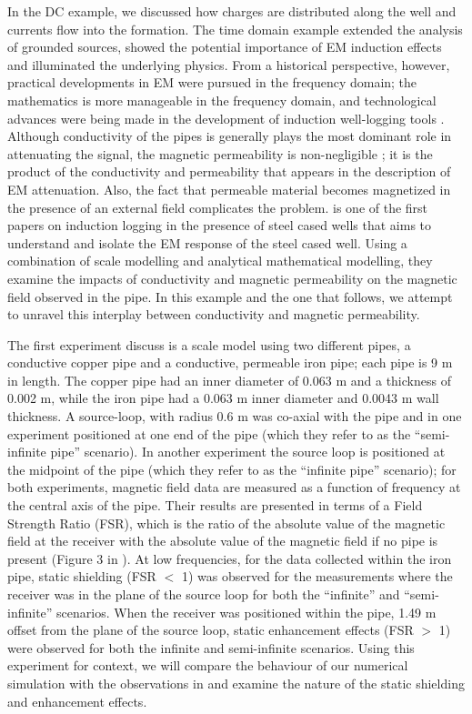 In the DC example, we discussed how charges are distributed along the well and currents flow into the formation. The time domain example extended the analysis of grounded sources, showed the potential importance of EM induction effects and illuminated the underlying physics. From a historical perspective, however, practical developments in EM were pursued in the frequency domain; the mathematics is more manageable in the frequency domain, and technological advances were being made in the development of induction well-logging tools \citep{Doll1949, Moran1962}. Although conductivity of the pipes is generally plays the most dominant role in attenuating the signal, the magnetic permeability is non-negligible \citep{Wait1977}; it is the product of the conductivity and permeability that appears in the description of EM attenuation. Also, the fact that permeable material becomes magnetized in the presence of an external field complicates the problem.
\cite{Augustin1989} is one of the first papers on induction logging in the presence of steel cased wells that aims to understand and isolate the EM response of the steel cased well. Using a combination of scale modelling and analytical mathematical modelling, they examine the impacts of conductivity and magnetic permeability on the magnetic field observed in the pipe. In this example and the one that follows, we attempt to unravel this interplay between conductivity and magnetic permeability.

The first experiment \cite{Augustin1989} discuss is a scale model using two different pipes, a conductive copper pipe and a conductive, permeable iron pipe; each pipe is 9 m in length. The copper pipe had an inner diameter of 0.063 m and a thickness of 0.002 m, while the iron pipe had a 0.063 m inner diameter and 0.0043 m wall thickness. A source-loop, with radius 0.6 m was co-axial with the pipe and in one experiment positioned at one end of the pipe (which they refer to as the ``semi-infinite pipe'' scenario). In another experiment the source loop is positioned at the midpoint of the pipe (which they refer to as the ``infinite pipe'' scenario); for both experiments, magnetic field data are measured as a function of frequency at the central axis of the pipe. Their results are presented in terms of a Field Strength Ratio (FSR), which is the ratio of the absolute value of the magnetic field at the receiver with the absolute value of the magnetic field if no pipe is present (Figure 3 in \cite{Augustin1989}). At low frequencies, for the data collected within the iron pipe, static shielding (FSR $<$ 1) was observed for the measurements where the receiver was in the plane of the source loop for both the ``infinite'' and ``semi-infinite'' scenarios. When the receiver was positioned within the pipe, 1.49 m offset from the plane of the source loop, static enhancement effects (FSR $>$ 1) were observed for both the infinite and semi-infinite scenarios. Using this experiment for context, we will compare the behaviour of our numerical simulation with the observations in \citep{Augustin1989} and examine the nature of the static shielding and enhancement effects.


